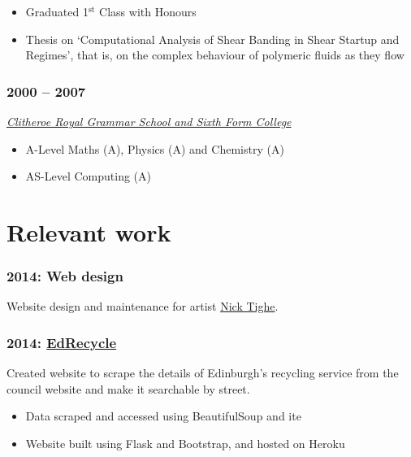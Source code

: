 \documentclass[10pt]{article}
\begin{document}
            \begin{itemize}
                \item Graduated 1$^\mathrm{st}$ Class with Honours
                \item Thesis on `Computational Analysis of Shear Banding in Shear Startup and  Regimes', that is, on the complex behaviour of polymeric fluids as they flow
            \end{itemize}

        \subsubsection{2000 -- 2007}
            \textit{\href{http://www.crgs.org.uk}{Clitheroe Royal Grammar School and Sixth Form College}}

            \begin{itemize}
                \item A-Level Maths (A), Physics (A) and Chemistry (A)
                \item AS-Level Computing (A)
            \end{itemize}

    \newpage

    \section{Relevant work}

        \subsubsection{2014: Web design}

            Website design and maintenance for artist \href{http://www.nicktighe.uk}{Nick Tighe}.

        \subsubsection{2014: \href{http://edrecycle.elliotmarsden.com}{EdRecycle}}

            Created website to scrape the details of Edinburgh's recycling service from the council website and make it searchable by street.

            \begin{itemize}
                \item{Data scraped and accessed using BeautifulSoup and ite}
                \item{Website built using Flask and Bootstrap, and hosted on Heroku}
            \end{itemize}
\end{document}

